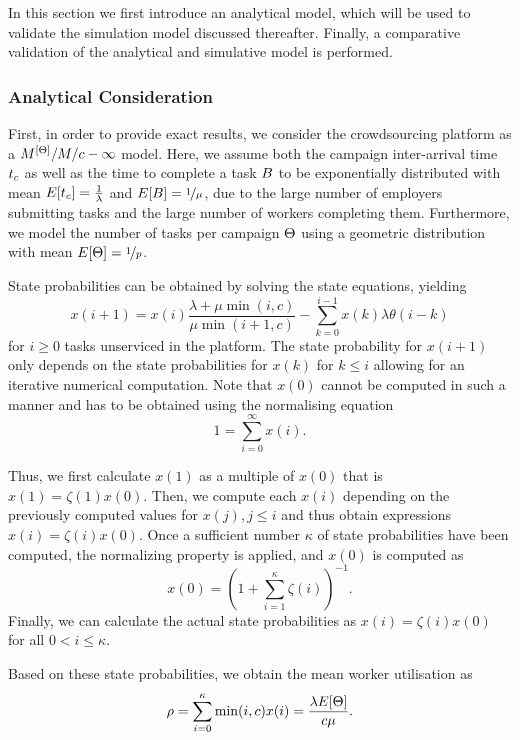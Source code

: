 In this section we first introduce an analytical model, which will be used to validate the simulation model discussed thereafter.
Finally, a comparative validation of the analytical and simulative model is performed.

\subsubsection*{Analytical Consideration}

First, in order to provide exact results, we consider the crowdsourcing platform as a \(M^{[\Theta]}/M/c-\infty\) model.
Here, we assume both the campaign inter-arrival time \(t_c\) as well as the time to complete a task \(B\) to be exponentially distributed with mean \(E[t_c] = \frac{1}{\lambda}\) and \(E[B] = \nicefrac{1}{\mu}\), due to the large number of employers submitting tasks and the large number of workers completing them.
Furthermore, we model the number of tasks per campaign \(\Theta\) using a geometric distribution with mean \(E[\Theta] = \nicefrac{1}{p}\).

State probabilities\cite{Kleinrock1975} can be obtained by solving the state equations, yielding
\[
x(i + 1) = x(i) \frac{\lambda + \mu \min(i, c)}{\mu \min(i + 1, c)} - \sum_{k=0}^{i-1} x(k) \lambda \theta(i - k)
\]
for \(i \geq 0\) tasks unserviced in the platform.
The state probability for \(x(i+1)\) only depends on the state probabilities for \(x(k)\) for \(k \leq i\) allowing for an iterative numerical computation.
Note that \(x(0)\) cannot be computed in such a manner and has to be obtained using the normalising equation 
\[
1 = \sum_{i=0}^{\infty} x(i).
\]

Thus, we first calculate \(x(1)\) as a multiple of \(x(0)\) that is \(x(1) = \zeta(1) x(0)\).
Then, we compute each \(x(i)\) depending on the previously computed values for \(x(j), j \leq i\) and thus obtain expressions \(x(i) = \zeta(i) x(0)\).  
Once a sufficient number \(\kappa\) of state probabilities have been computed, the normalizing property is applied, and \(x(0)\) is computed as
\[
	x(0) = \left(1 + \sum_{i = 1}^\kappa \zeta(i)\right)^{-1}.
\]
Finally, we can calculate the actual state probabilities as \(x(i) = \zeta(i) x(0)\) for all \(0 < i \leq \kappa\).

Based on these state probabilities, we obtain the mean worker utilisation \workerUtilization as
\[
\rho = \sum_{i=0}^{\kappa} \min(i, c) x(i) = \frac{\lambda E[\Theta]}{c\mu}. 
\]


